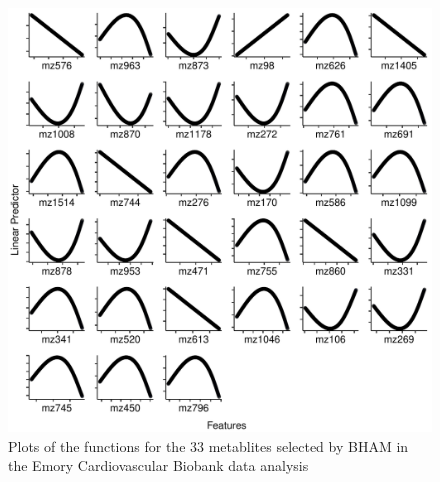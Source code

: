 \documentclass[AMA,STIX1COL,]{WileyNJD-v2}
\begin{document}
\clearpage
\begin{figure}[h] 
\includegraphics{Figs/ECB_plot}
\caption{Plots of the functions for the 33 metablites selected by BHAM in the Emory Cardiovascular Biobank data analysis}
\label{fig:ECB_fig}
\end{figure}
\end{document}

